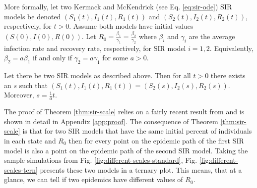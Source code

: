 \documentclass[
  shortnames]{jss}
\begin{document}
More formally, let two Kermack and McKendrick (see Eq.
\eqref{eq:sir-ode}) SIR models be denoted \((S_1(t), I_1(t), R_1(t))\)
and \((S_2(t), I_2(t), R_2(t))\), respectively, for \(t > 0\). Assume
both models have initial values \((S(0), I(0), R(0))\). Let
\(R_0 = \frac{\beta_1}{\gamma_1} = \frac{\beta_2}{\gamma_2}\) where
\(\beta_i\) and \(\gamma_i\) are the average infection rate and recovery
rate, respectively, for SIR model \(i=1, 2\). Equivalently,
\(\beta_2 = a \beta_1\) if and only if \(\gamma_2 = a \gamma_1\) for
some \(a > 0\).

\begin{theorem}\label{thm:sir-scale}
Let there be two SIR models as described above.  Then for all $t > 0$ there exists an $s$ such that $(S_1(t), I_1(t), R_1(t)) = (S_2(s), I_2(s), R_2(s))$.  Moreover, $s = \frac{1}{a}t$.
\end{theorem}

The proof of Theorem \ref{thm:sir-scale} relies on a fairly recent
result from \cite{Harko2014} and is shown in detail in Appendix
\ref{app:proof}. The consequence of Theorem \ref{thm:sir-scale} is that
for two SIR models that have the same initial percent of individuals in
each state and \(R_0\) then for every point on the epidemic path of the
first SIR model is also a point on the epidemic path of the second SIR
model. Taking the sample simulations from Fig.
\ref{fig:different-scales-standard}, Fig.
\ref{fig:different-scales-tern} presents these two models in a ternary
plot. This means, that at a glance, we can tell if two epidemics have
different values of \(R_0\).
\end{document}
